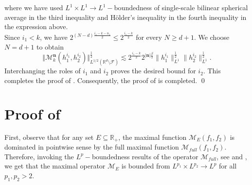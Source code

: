 \documentclass[a4paper,reqno]{amsart}
\newcounter{old}
\numberwithin{equation}{section}
\newcommand{\R}{{\mathbb {R}}}
\begin{document}
	where we have used $L^1\times L^1\to L^1-$boundedness of single-scale bilinear spherical average in the third inequality and H\"older's inequality in the fourth inequality in the expression above. \\
	Since $i_1<k$, we have $2^{(N-d)\frac{i_1-k-n_1}{2}}\leq 2^{\frac{i_1-k}{2}}$ for every $N\geq d+1$. We choose $N=d+1$ to obtain
	\[\Vert \mathcal{M}^{\mathbf{n}}_k(h^{i_1}_1,h^{i_2}_2)\Vert_{L^{1/2}(\mathbb{R}^{d}\setminus\mathcal{F})}^\frac{1}{2}\lesssim 2^{\frac{i_1-k}{2}}2^{|\mathbf{n}|\frac{\beta}{2}}\|h^{i_1}_1\|_{L^1}^\frac{1}{2}\|h^{i_2}_2\|_{L^1}^\frac{1}{2}.\]
	Interchanging the roles of $i_1$ and $i_2$ proves the desired bound for $i_2$. This completes the proof of .  Consequently, the proof of  is completed.
	\qed
	
	\section{Proof of }\label{d=1}
	First, observe that for any set $E\subseteq \R_+$, the maximal function $\mathcal{M}_E(f_1,f_2)$ is dominated in pointwise sense by the full maximal function $\mathcal{M}_{full}(f_1,f_2)$. Therefore, invoking the $L^p-$boundedness  results of the operator $\mathcal{M}_{full}$, see \cite[Theorem 1.3]{ChristZhou} and \cite[Theorem 1]{DosidisRamos}, we get that the maximal operator $\mathcal{M}_E$ is bounded from $L^{p_1}\times L^{p_2}\to L^{p}$ for all $p_1, p_2>2$. 
	
\end{document}
